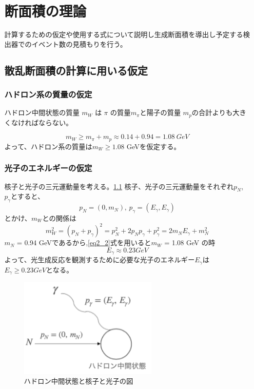 \chapter{断面積の理論} \label{cha:cross_section}
計算するための仮定や使用する式について説明し生成断面積を導出し予定する検出器でのイベント数の見積もりを行う。

\section{散乱断面積の計算に用いる仮定}
\subsection{ハドロン系の質量の仮定}
ハドロン中間状態の質量 $m_W$ は $\pi$ の質量$m_\pi$と陽子の質量 $m_p$の合計よりも大きくなければならない。

\begin{equation}
    m_W \geq m_\pi + m_p \approx 0.14 + 0.94 = 1.08 \ GeV
\end{equation}
よって、ハドロン系の質量は$m_W \geq 1.08$ GeVを仮定する。

\subsection{光子のエネルギーの仮定}
核子と光子の三元運動量を考える。\ref{fig:sigma1}
核子、光子の三元運動量をそれぞれ$p_N$, $p_\gamma$とすると、
\begin{equation}
    p_N = (0, m_N),\  p_\gamma = (E_\gamma, E_\gamma)
\end{equation}
とかけ、$m_W$との関係は
\begin{equation}
    \label{eq2_2}
    m_W^2 = (p_N + p_\gamma)^2 = p_N^2 + 2p_N p_\gamma + p_\gamma^2
    = 2m_N E_\gamma + m_N^2
\end{equation}
$m_N$ = 0.94 GeVであるから,\ref{eq2_2}式を用いると$m_W$ = 1.08 GeV の時
\begin{equation}
    E_\gamma \approx 0.23 GeV
\end{equation}
よって、光生成反応を観測するために必要な光子のエネルギー$E_\gamma$は
$E_\gamma \geq 0.23 GeV$となる。
\begin{figure}[H]
    \centering
    \includegraphics[height=5cm]{img/diagram_momentum.png}
    \caption{ハドロン中間状態と核子と光子の図}
    \label{fig:sigma1}
\end{figure}

